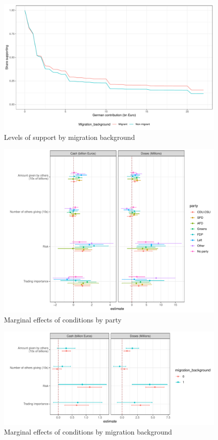 \documentclass[]{article}
\begin{document}
\begin{figure}[hbt!]
	\includegraphics[width=\linewidth]{"../2_output/cumulative_by_migration.pdf"}
	\caption{Levels of support by migration background}
	\label{fig:cumb}
\end{figure}


\begin{figure}[hbt!]
	\includegraphics[width=\linewidth]{"../2_output/figure_1_party.pdf"}
	\caption{Marginal effects of conditions by party}
	\label{fig:mainp}
\end{figure}

\begin{figure}[hbt!]
	\includegraphics[width=\linewidth]{"../2_output/figure_1_background.pdf"}
	\caption{Marginal effects of conditions by migration background}
	\label{fig:mainb}
\end{figure}
\end{document}
